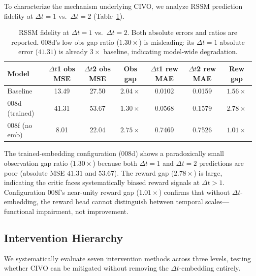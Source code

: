 \documentclass[10pt,letterpaper]{article}
\newcommand{\dt}{\Delta t}
\begin{document}
To characterize the mechanism underlying CIVO, we analyze RSSM prediction fidelity at $\dt = 1$ vs.\ $\dt = 2$ (Table~\ref{tab:rssm_fidelity}).

\begin{table}[h]
\centering
\caption{RSSM fidelity at $\dt = 1$ vs.\ $\dt = 2$. Both absolute errors and ratios are reported. 008d's low obs gap ratio ($1.30\times$) is misleading: its $\dt = 1$ absolute error ($41.31$) is already $3\times$ baseline, indicating model-wide degradation.}
\label{tab:rssm_fidelity}
\small
\begin{tabular}{lcccccc}
\toprule
\textbf{Model} & \textbf{$\dt$1 obs MSE} & \textbf{$\dt$2 obs MSE} & \textbf{Obs gap} & \textbf{$\dt$1 rew MAE} & \textbf{$\dt$2 rew MAE} & \textbf{Rew gap} \\
\midrule
Baseline & 13.49 & 27.50 & $2.04\times$ & 0.0102 & 0.0159 & $1.56\times$ \\
008d (trained) & 41.31 & 53.67 & $1.30\times$ & 0.0568 & 0.1579 & $2.78\times$ \\
008f (no emb) & 8.01 & 22.04 & $2.75\times$ & 0.7469 & 0.7526 & $1.01\times$ \\
\bottomrule
\end{tabular}
\end{table}

The trained-embedding configuration (008d) shows a paradoxically small observation gap ratio ($1.30\times$) because both $\dt = 1$ and $\dt = 2$ predictions are poor (absolute MSE $41.31$ and $53.67$). The reward gap ($2.78\times$) is large, indicating the critic faces systematically biased reward signals at $\dt > 1$. Configuration 008f's near-unity reward gap ($1.01\times$) confirms that without $\dt$-embedding, the reward head cannot distinguish between temporal scales---functional impairment, not improvement.

\subsection{Intervention Hierarchy}
\label{sec:interventions}

We systematically evaluate seven intervention methods across three levels, testing whether CIVO can be mitigated without removing the $\dt$-embedding entirely.
\end{document}
